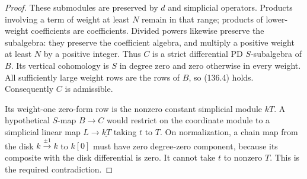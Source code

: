 \begin{proof}
These submodules are preserved by $d$ and simplicial
operators.  Products involving a term of weight at
least $N$ remain in that range; products of lower-weight
coefficients are coefficients.  Divided powers likewise
preserve the subalgebra: they preserve the coefficient
algebra, and multiply a positive weight at least $N$
by a positive integer.  Thus $C$ is a strict differential
PD $S$-subalgebra of $B$.
Its vertical cohomology is $S$ in degree zero and zero
otherwise in every weight.  All sufficiently large
weight rows are the rows of $B$, so (136.4) holds.
Consequently $C$ is admissible.

Its weight-one zero-form row is the nonzero constant
simplicial module $kT$.  A hypothetical $S$-map
$B\to C$ would restrict on the coordinate module to
a simplicial linear map $L\to\underline{kT}$ taking
$t$ to $T$.  On normalization, a chain map from the
disk $k\xrightarrow{\pm1}k$ to $k[0]$ must have zero
degree-zero component, because its composite with
the disk differential is zero.  It cannot take $t$
to nonzero $T$.  This is the required contradiction.
\end{proof}
